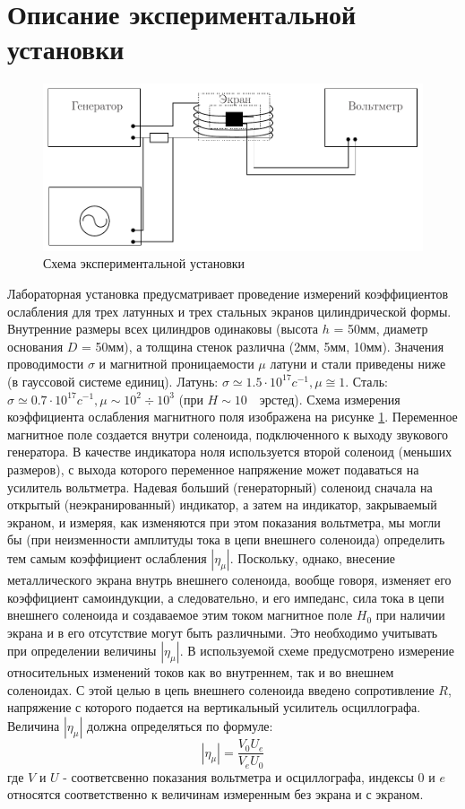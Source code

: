 \section{Описание экспериментальной установки}
\begin{figure}[h]
	\centering
	\includegraphics[scale=1]{text/main2.pdf}
	\caption{Схема экспериментальной установки}
	\label{fig:figure1}
\end{figure}
Лабораторная установка предусматривает проведение измерений коэффициентов ослабления для трех латунных и трех стальных экранов цилиндрической формы. Внутренние размеры всех цилиндров одинаковы (высота $h$ = 50мм, диаметр основания $D$ = 50мм), а толщина стенок различна (2мм, 5мм, 10мм). Значения проводимости $\sigma$ и магнитной проницаемости $\mu$ латуни и стали приведены ниже (в гауссовой системе единиц).
Латунь: $\sigma \simeq 1.5\cdot 10^{17} c^{-1}, \mu \cong 1$.
Сталь: $\sigma \simeq 0.7\cdot 10^{17} c^{-1}, \mu \sim 10^2 \div 10^3 $ (при $H \sim 10\text{ }$ эрстед).
Схема измерения коэффициента ослабления магнитного поля изображена на рисунке \ref{fig:figure1}. Переменное магнитное поле создается внутри соленоида, подключенного к выходу звукового генератора. В качестве индикатора ноля используется второй соленоид (меньших размеров), с выхода которого переменное напряжение может подаваться на усилитель вольтметра. Надевая больший (генераторный) соленоид сначала на открытый (неэкранированный) индикатор, а затем на индикатор, закрываемый экраном, и измеряя, как изменяются при этом показания вольтметра, мы могли бы (при неизменности амплитуды тока в цепи внешнего соленоида) определить тем самым коэффициент ослабления $|\eta_{\mu}|$. Поскольку, однако, внесение металлического экрана внутрь внешнего соленоида, вообще говоря, изменяет его коэффициент самоиндукции, а следовательно, и его импеданс, сила тока в цепи внешнего соленоида и создаваемое этим током магнитное поле $H_0$ при наличии экрана и в его отсутствие могут быть различными. Это необходимо учитывать при определении величины $|\eta_{\mu}|$. В используемой схеме предусмотрено измерение относительных изменений токов как во внутреннем, так и во внешнем соленоидах. С этой целью в цепь внешнего соленоида введено сопротивление $R$, напряжение с которого подается на вертикальный усилитель осциллографа. Величина $|\eta_{\mu}|$ должна определяться по формуле:
\begin{equation}
	|\eta_{\mu}|=\frac{V_0U_e}{V_eU_0}
\label{eq:7}
\end{equation}
где $V$ и $U$ - соответсвенно показания вольтметра и осциллографа, индексы $0$ и $e$ относятся соответственно к величинам измеренным без экрана и с экраном.
